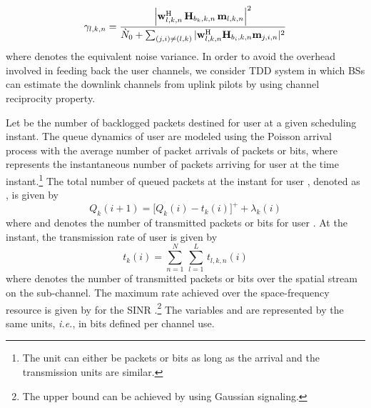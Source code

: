 \begin{equation}\label{eq:SINR}
\gamma_{l,k,n} = \dfrac{\left |\mvec{w}{l,k,n}^\herm \, \mvec{H}{b_k,k,n} \, \mvec{m}{l,k,n} \right |^2}{\enoise + \sum_{(j,i) \neq (l,k)} |\mvec{w}{l,k,n}^\herm \mvec{H}{b_i,k,n} \mvec{m}{j,i,n} |^2}
\end{equation}
where  denotes the equivalent noise variance. In order to avoid the overhead involved in feeding back the user channels, we consider \ac{TDD} system in which \acp{BS} can estimate the downlink channels from uplink pilots by using channel reciprocity property.

Let  be the number of backlogged packets destined for user  at a given scheduling instant. The queue dynamics of user  are modeled using the Poisson arrival process with the average number of packet arrivals of  packets or bits, where  represents the instantaneous number of packets arriving for user  at the  time instant.\footnote{The unit can either be packets or bits as long as the arrival and the transmission units are similar.} The total number of queued packets at the  instant for user , denoted as , is given by
\begin{equation}
Q_k(i+1) = \Big [ Q_k(i) - t_k(i) \Big ]^+ + \lambda_k(i)
\label{eqn-2a}
\end{equation}
where  and  denotes the number of transmitted packets or bits for user . At the  instant, the transmission rate of user  is given by
\begin{equation}
t_k(i) = \sum_{n = 1}^N \, \sum_{l = 1}^L \, t_{l,k,n}(i)
\end{equation}
where  denotes the number of transmitted packets or bits over the  spatial stream on the  sub-channel. The maximum rate achieved over the space-frequency resource  is given by  for the \ac{SINR} .\footnote{The upper bound can be achieved by using Gaussian signaling.} The variables  and  are represented by the same units, \textit{i.e.}, in bits defined per channel use. 